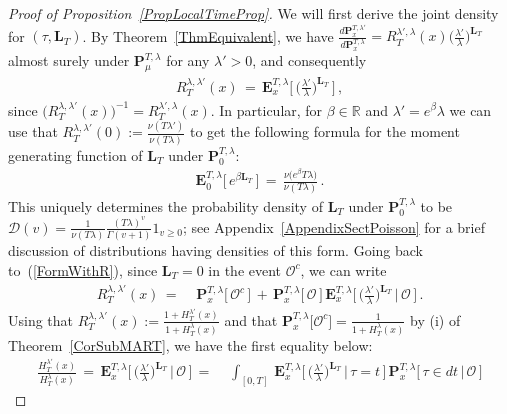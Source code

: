 \documentclass[10pt]{article}
\numberwithin{equation}{section}
\theoremstyle{definition}
\newcommand{\R}{{\mathbb R}}
\begin{document}
\begin{proof}[Proof of Proposition~\ref{PropLocalTimeProp}] We will first derive the joint density for $(\tau,\mathbf{L}_T)$.  By Theorem~\ref{ThmEquivalent}, we have $ \frac{d\mathbf{P}_{x}^{T,\lambda'}}{d\mathbf{P}_{x}^{T,\lambda}}=R^{\lambda',\lambda}_{T}(x)  \big(\frac{ \lambda'}{\lambda}  \big)^{\mathbf{L}_{T}} $ almost surely under $\mathbf{P}_{\mu}^{T,\lambda}$ for any $\lambda'>0$, and consequently 
\begin{align} \label{FormWithR}
  R^{\lambda,\lambda'}_{T}(x)\,=\,\mathbf{E}_{x}^{T,\lambda}\bigg[ \,\Big(\frac{ \lambda'}{\lambda}  \Big)^{\mathbf{L}_{T}} \,\bigg]\,,
\end{align}
  since $ \big(R^{\lambda,\lambda'}_{T}(x)\big)^{-1}=R^{\lambda',\lambda}_{T}(x)$.  In particular, for $\beta\in \R$  and  $\lambda'=e^{\beta}\lambda$ we can use that $ R^{\lambda,\lambda'}_{T}(0):=\frac{\nu(T\lambda')  }{ \nu(T\lambda)  }$ to get the following formula for the moment generating function of $\mathbf{L}_{T}$ under $\mathbf{P}_{0}^{T,\lambda}$:
\begin{align}  \label{RatioE}
\mathbf{E}_{0}^{T,\lambda}\big[\, e^{\beta \mathbf{L}_{T}} \,\big]\,=\, \frac{\nu\big(e^{\beta}T\lambda \big)  }{ \nu(T\lambda)  }\,.
\end{align}
This uniquely determines the probability density of  $ \mathbf{L}_{T}$ under $\mathbf{P}_{0}^{T,\lambda}$ to be  $\mathcal{D}(v)=\frac{1}{\nu(T\lambda)}   \frac{ (T\lambda )^v  }{\Gamma(v+1)  }1_{v\geq 0}$; see Appendix~\ref{AppendixSectPoisson} for a brief discussion of distributions having  densities of this form.  Going back to~(\ref{FormWithR}), since $\mathbf{L}_{T}=0$ in the event $\mathcal{O}^c$, we can write
\begin{align*}
  R^{\lambda,\lambda'}_{T}(x)\,=\,&\,\mathbf{P}_{x }^{T,\lambda}\big[\,\mathcal{O}^c\,\big]\,+\,\mathbf{P}_{x }^{T,\lambda}\big[\,\mathcal{O}\,\big]\,\mathbf{E}_{x}^{T,\lambda}\bigg[\, \Big(\frac{ \lambda'}{\lambda}  \Big)^{\mathbf{L}_{T}}\, \bigg|\, \mathcal{O}\,\bigg]  \,.
 \end{align*}
Using that $ R^{\lambda,\lambda'}_{T}(x):= \frac{1+ H^{\lambda'}_T(x)  }{1+ H^{\lambda}_T(x)   }$ and that $\mathbf{P}_{x }^{T,\lambda}\big[\mathcal{O}^c\big]=\frac{ 1 }{ 1+H^{\lambda}_T(x)   }$ by (i) of Theorem~\ref{CorSubMART}, we have the first equality below:
 \begin{align}\label{FormWithR2}
  \frac{ H^{\lambda'}_T(x)  }{ H^{\lambda}_T(x)   }\,=\,\mathbf{E}_{x}^{T,\lambda}\bigg[\, \Big(\frac{ \lambda'}{\lambda}  \Big)^{\mathbf{L}_{T}}\, \bigg|\, \mathcal{O}\,\bigg]\nonumber \,=\,&\,\int_{[0,T]}\, \mathbf{E}_{x}^{T,\lambda}\bigg[\, \Big(\frac{ \lambda'}{\lambda}  \Big)^{\mathbf{L}_{T}}\, \bigg|\, \tau=t\, \bigg]\,\mathbf{P}_{x }^{T,\lambda}\big[\,\tau \in dt\,\big|\,\mathcal{O}\,\big] \nonumber

\end{align}
\end{proof}
\end{document}
